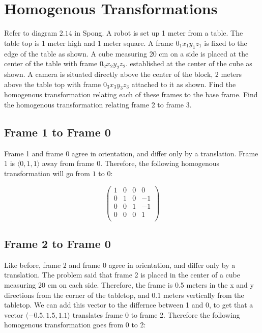 \documentclass{article}
\begin{document}
\section{Homogenous Transformations}

Refer to diagram $2.14$ in Spong.
A robot is set up 1 meter from a table.
The table top is 1 meter high and 1 meter square.
A frame $0_1 x_1 y_1 z_1$ is fixed to the edge of the table
	as shown.
A cube measuring 20 cm on a side is placed
	at the center of the table with frame $0_2 x_2 y_2 z_2$.
	established at the center of the cube as shown.
A camera is situated directly above the center of the block,
	2 meters above the table top with frame $0_3 x_3 y_3 z_3$
	attached to it as shown.
Find the homogenous transformation relating each of these
	frames to the base frame.
Find the homogenous transformation relating frame 2 to frame 3.

\subsection{Frame 1 to Frame 0}

Frame 1 and frame 0 agree in orientation, and differ only by a translation.
Frame 1 is $\langle 0, 1, 1 \rangle$ away from frame 0.
Therefore, the following homogenous transformation will go from
	$1$ to $0$:

\[ \left( 
	\begin{matrix}
		1 & 0 & 0 & 0\\
		0 & 1 & 0 & -1\\
		0 & 0 & 1 & -1\\
		0 & 0 & 0 & 1 \\
	\end{matrix} \right) \]

\subsection{Frame 2 to Frame 0}

Like before, frame 2 and frame 0 agree in orientation, and differ
	only by a translation.
The problem said that frame 2 is placed in the center of a cube 
	measuring 20 cm on each side.
Therefore, the frame is 0.5 meters in the x and y directions
	from the corner of the tabletop,
	and 0.1 meters vertically from the tabletop.
We can add this vector to the differnce between 1 and 0, 
	to get that a vector $\langle -0.5, 1.5, 1.1 \rangle$
	translates frame 0 to frame 2.
Therefore the following homogenous transformation goes from 0 to 2:
\end{document}
